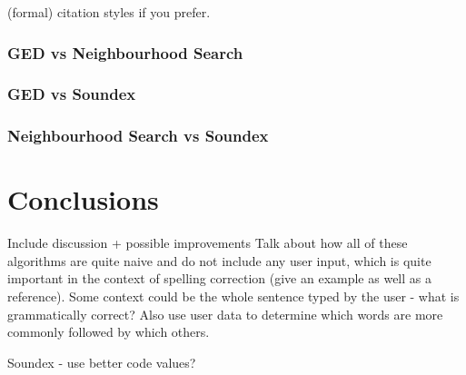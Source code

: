 \documentclass[11pt]{article}
\begin{document}
 (formal) citation styles if you prefer.


\subsubsection{GED vs Neighbourhood Search}

 
\subsubsection{GED vs Soundex}


\subsubsection{Neighbourhood Search vs Soundex}


\section{Conclusions}

Include discussion + possible improvements
Talk about how all of these algorithms are quite naive and do not include any user input, which is quite important in the context of spelling correction (give an example as well as a reference). Some context could be the whole sentence typed by the user - what is grammatically correct? Also use user data to determine which words are more commonly followed by which others.


Soundex - use better code values?
\end{document}
